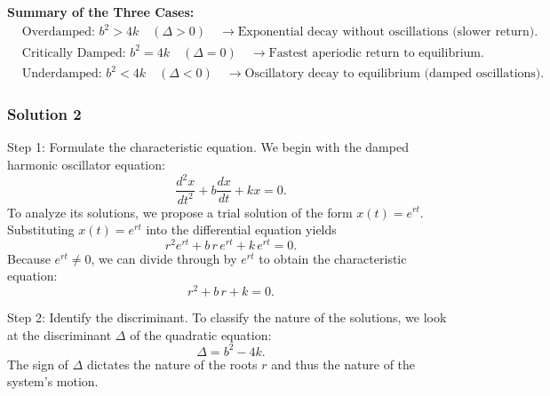 \documentclass{article}
\begin{document}
\noindent
\textbf{Summary of the Three Cases:}
\[
\begin{aligned}
&\text{Overdamped: } b^2 > 4k \quad(\Delta > 0)\quad \rightarrow \text{Exponential decay without oscillations (slower return).}\\
&\text{Critically Damped: } b^2 = 4k \quad(\Delta = 0)\quad \rightarrow \text{Fastest aperiodic return to equilibrium.}\\
&\text{Underdamped: } b^2 < 4k \quad(\Delta < 0)\quad \rightarrow \text{Oscillatory decay to equilibrium (damped oscillations).}
\end{aligned}
\]

\subsubsection{Solution 2}

{Step 1: Formulate the characteristic equation.}
We begin with the damped harmonic oscillator equation:
\[
\frac{d^2x}{dt^2} + b \frac{dx}{dt} + kx = 0.
\]
To analyze its solutions, we propose a trial solution of the form \(x(t) = e^{rt}\). Substituting \(x(t) = e^{rt}\) into the differential equation yields
\[
r^2 e^{rt} + b\,r\,e^{rt} + k\,e^{rt} = 0.
\]
Because \(e^{rt} \neq 0\), we can divide through by \(e^{rt}\) to obtain the characteristic equation:
\[
r^2 + b\,r + k = 0.
\]

{Step 2: Identify the discriminant.}
To classify the nature of the solutions, we look at the discriminant \(\Delta\) of the quadratic equation:
\[
\Delta = b^2 - 4k.
\]
The sign of \(\Delta\) dictates the nature of the roots \(r\) and thus the nature of the system's motion.
\end{document}
